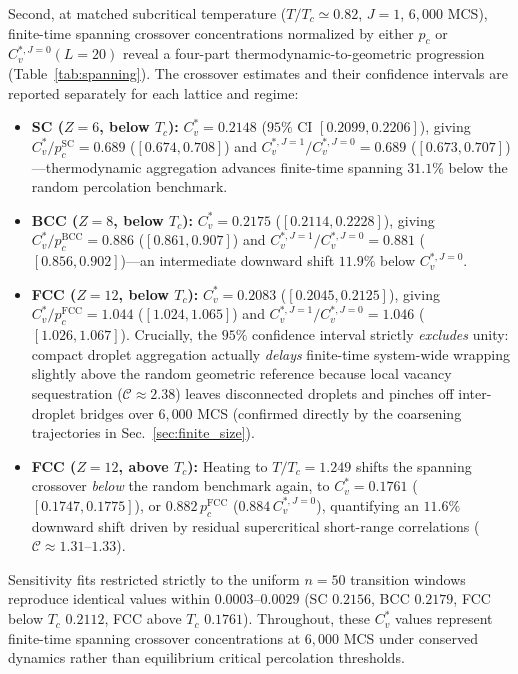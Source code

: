\documentclass[aps,pre,reprint,superscriptaddress,amsmath,amssymb,floatfix]{revtex4-2}
\begin{document}
Second, at matched subcritical temperature ($T/T_c \simeq 0.82$, $J = 1$, $6{,}000$ MCS), finite-time spanning crossover concentrations normalized by either $p_c$ or $C_v^{*,J=0}(L=20)$ reveal a four-part thermodynamic-to-geometric progression (Table~\ref{tab:spanning}). The crossover estimates and their confidence intervals are reported separately for each lattice and regime:
\begin{itemize}
  \item \textbf{SC ($Z = 6$, below $T_c$):} $C_v^* = 0.2148$ ($95\%$ CI $[0.2099, 0.2206]$), giving $C_v^*/p_c^{\mathrm{SC}} = 0.689$ ($[0.674, 0.708]$) and $C_v^{*,J=1}/C_v^{*,J=0} = 0.689$ ($[0.673, 0.707]$)---thermodynamic aggregation advances finite-time spanning $31.1\%$ below the random percolation benchmark.
  \item \textbf{BCC ($Z = 8$, below $T_c$):} $C_v^* = 0.2175$ ($[0.2114, 0.2228]$), giving $C_v^*/p_c^{\mathrm{BCC}} = 0.886$ ($[0.861, 0.907]$) and $C_v^{*,J=1}/C_v^{*,J=0} = 0.881$ ($[0.856, 0.902]$)---an intermediate downward shift $11.9\%$ below $C_v^{*,J=0}$.
  \item \textbf{FCC ($Z = 12$, below $T_c$):} $C_v^* = 0.2083$ ($[0.2045, 0.2125]$), giving $C_v^*/p_c^{\mathrm{FCC}} = 1.044$ ($[1.024, 1.065]$) and $C_v^{*,J=1}/C_v^{*,J=0} = 1.046$ ($[1.026, 1.067]$). Crucially, the $95\%$ confidence interval strictly \emph{excludes} unity: compact droplet aggregation actually \emph{delays} finite-time system-wide wrapping slightly above the random geometric reference because local vacancy sequestration ($\mathcal{C} \approx 2.38$) leaves disconnected droplets and pinches off inter-droplet bridges over $6{,}000$ MCS (confirmed directly by the coarsening trajectories in Sec.~\ref{sec:finite_size}).
  \item \textbf{FCC ($Z = 12$, above $T_c$):} Heating to $T/T_c = 1.249$ shifts the spanning crossover \emph{below} the random benchmark again, to $C_v^* = 0.1761$ ($[0.1747, 0.1775]$), or $0.882\,p_c^{\mathrm{FCC}}$ ($0.884\,C_v^{*,J=0}$), quantifying an $11.6\%$ downward shift driven by residual supercritical short-range correlations ($\mathcal{C} \approx 1.31$--$1.33$).
\end{itemize}
Sensitivity fits restricted strictly to the uniform $n = 50$ transition windows reproduce identical values within $0.0003$--$0.0029$ (SC $0.2156$, BCC $0.2179$, FCC below $T_c$ $0.2112$, FCC above $T_c$ $0.1761$). Throughout, these $C_v^*$ values represent finite-time spanning crossover concentrations at $6{,}000$ MCS under conserved dynamics rather than equilibrium critical percolation thresholds.
\end{document}
